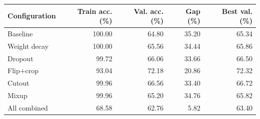 \begin{tabular}{lrrrr}
\toprule
Configuration & Train acc. (\%) & Val. acc. (\%) & Gap (\%) & Best val. (\%) \\
\midrule
Baseline & 100.00 & 64.80 & 35.20 & 65.34 \\
Weight decay & 100.00 & 65.56 & 34.44 & 65.86 \\
Dropout & 99.72 & 66.06 & 33.66 & 66.50 \\
Flip+crop & 93.04 & 72.18 & 20.86 & 72.32 \\
Cutout & 99.96 & 66.56 & 33.40 & 66.72 \\
Mixup & 99.96 & 65.20 & 34.76 & 65.82 \\
All combined & 68.58 & 62.76 & 5.82 & 63.40 \\
\bottomrule
\end{tabular}
